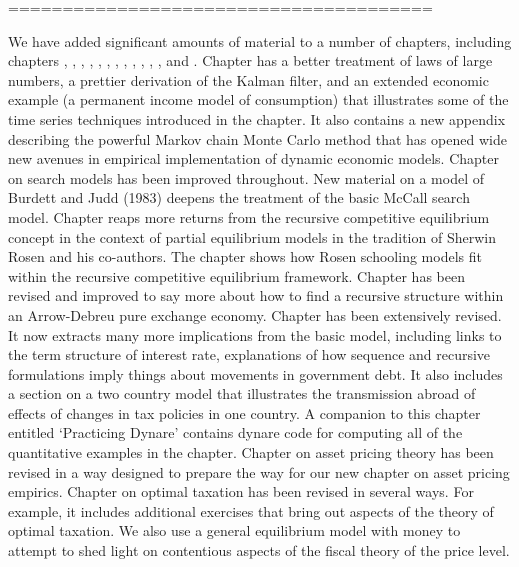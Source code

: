 =======================================

We have added significant amounts of material to a number of chapters, including chapters
, , , , , , , , , , ,
, and . Chapter  has a better treatment
of laws of large numbers, a prettier derivation of the Kalman filter,  and an extended economic example (a
permanent income model of consumption) that    illustrates some of  the time series
techniques introduced in the chapter. It also contains a new appendix describing the powerful  Markov chain Monte Carlo
method that has opened wide new avenues in empirical implementation of dynamic economic models.
Chapter  on search models  has been improved throughout.  New material on a model of Burdett and Judd (1983) deepens the treatment of the basic McCall search model.  Chapter  reaps more returns from the recursive competitive equilibrium concept in the context of partial equilibrium
  models in the tradition of Sherwin Rosen and his co-authors. The chapter shows how Rosen schooling models
  fit within the recursive competitive equilibrium framework. Chapter  has been revised and improved to say
 more about how to find a recursive structure within an
Arrow-Debreu pure exchange economy. Chapter  has been extensively revised. It now  extracts many more implications from
the basic model, including  links to the term structure of interest
rate, explanations of how sequence and recursive formulations imply things about movements in government debt.  It also includes
a section on a two country model that illustrates the transmission abroad of effects of changes in tax policies in one country.
A companion to this chapter entitled `Practicing Dynare' contains dynare code for computing all of the quantitative examples in the chapter.
 Chapter  on asset pricing theory has been revised in a way designed to prepare the way for our new chapter  on asset pricing empirics.
 Chapter  on optimal taxation has been revised in several ways. For example, it  includes additional exercises that bring out aspects of the theory
 of optimal taxation. We also use a general equilibrium model with money to attempt to shed light on  contentious aspects of the fiscal theory of the price level.
